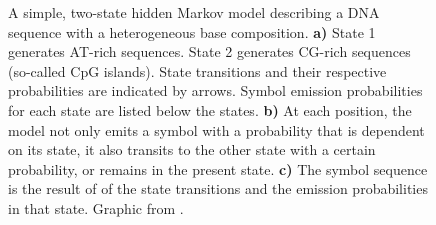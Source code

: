 \begin{figure}[t]
	\centering
	\def\svgwidth{\textwidth}
	
	\caption[A simple hidden Markov model]{A simple, two-state hidden Markov model
		describing a DNA sequence with a heterogeneous base composition. 
		\textbf{a)} State 1 generates AT-rich sequences. State 2 generates CG-rich
			sequences (so-called CpG islands). State transitions and their respective
			probabilities are indicated by arrows. Symbol emission probabilities for
			each state are listed below the states.
		\textbf{b)} At each position, the model not only emits a symbol with a
			probability that is dependent on its state, it also transits to the
			other state with a certain probability, or remains in the present state.
		\textbf{c)} The symbol sequence is the result of of the state transitions and
			the emission probabilities in that state.
		Graphic from \citet{eddy1996}.
	}
	\label{fig:hmm}
\end{figure}


